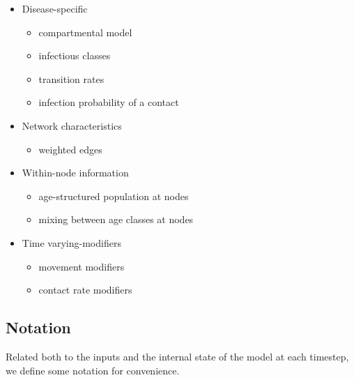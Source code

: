 \documentclass[11pt]{article}
\begin{document}
\begin{itemize}
\item Disease-specific
\begin{itemize}
\item compartmental model
\item infectious classes
\item transition rates
\item infection probability of a contact
\end{itemize}
\item Network characteristics
\begin{itemize}
\item weighted edges
\end{itemize}
\item Within-node information
\begin{itemize}
\item age-structured population at nodes
\item mixing between age classes at nodes
\end{itemize}
\item Time varying-modifiers
\begin{itemize}
\item movement modifiers
\item contact rate modifiers
\end{itemize}
\end{itemize}

\subsection{Notation}
Related both to the inputs and the internal state of the model at each timestep, we define some notation for convenience.  
\end{document}
